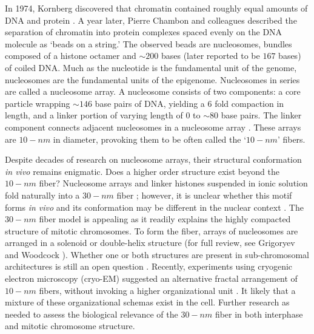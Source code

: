 In 1974, Kornberg discovered that chromatin contained roughly equal amounts of \gls{DNA} and protein \citep{kornberg1974}.  A year later, Pierre Chambon
and colleagues described the separation of chromatin into protein complexes spaced evenly on the \gls{DNA} molecule as `beads on a string.' \citep{oudet1975}
The observed beads are nucleosomes, bundles composed of a histone octamer and $\sim200$ bases (later reported to be $167$ bases) \citep{robinson2006} of
coiled \gls{DNA}. Much as the nucleotide is the fundamental unit of the genome, nucleosomes are the fundamental units of the epigenome.  Nucleosomes in
series are called a \gls{nucleosome array}.  A nucleosome consists of two components: a core particle wrapping $\sim146$ base pairs of DNA, yielding a
6 fold compaction in length, and a linker portion of varying length of $0$ to $\sim80$ base pairs.  The linker component connects adjacent nucleosomes
in a nucleosome array \citep{wu2007, hansen2012}.  These arrays are $10-nm$ in diameter, provoking them to be often called the `$10-nm$' fibers.

Despite decades of research on nucleosome arrays, their structural conformation \textit{\gls{in vivo}} remains enigmatic.   Does a higher order structure
exist beyond the $10-nm$ fiber?  Nucleosome arrays and linker histones suspended in ionic solution fold naturally into a $30-nm$ fiber \citep{tremethick2007};
however, it is unclear whether this motif forms \textit{\gls{in vivo}} and its conformation may be different in the nuclear context \citep{bian2012}.
The $30-nm$ fiber model is appealing as it readily explains the highly compacted structure of mitotic chromosomes.  To form the fiber, arrays of nucleosomes
are arranged in a solenoid or double-helix structure (for full review, see Grigoryev and Woodcock \citep{grigoryev2012}).  Whether one or both structures
are present in sub-chromosomal architectures is still an open question \citep{song2014}.  Recently, experiments using cryogenic electron microscopy
(cryo-EM) suggested an alternative fractal arrangement of $10-nm$ fibers, without invoking a higher organizational unit \citep{nishino2012,hansen2012}.
It likely that a mixture of these organizational schemas exist in the cell.  Further research as needed to assess the biological relevance of the $30-nm$ fiber in
both interphase and mitotic chromosome structure.

